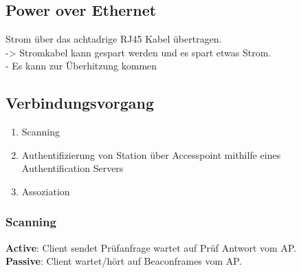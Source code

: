 \documentclass[12pt,a4paper]{article}
\begin{document}
	\subsection{Power over Ethernet}
		Strom über das achtadrige RJ45 Kabel übertragen.\\
		-> Stromkabel kann gespart werden und es spart etwas Strom.\\
		- Es kann zur Überhitzung kommen
	
	\subsection{Verbindungsvorgang}
		\begin{enumerate}
			\item Scanning
			\item Authentifizierung von Station über Accesspoint mithilfe eines Authentification Servers
			\item Assoziation
		\end{enumerate}

		\subsubsection{Scanning}
		\textbf{Active}: Client sendet Prüfanfrage wartet auf Prüf Antwort vom AP.\\
		\textbf{Passive}: Client wartet/hört auf Beaconframes vom AP.\\
\end{document}
